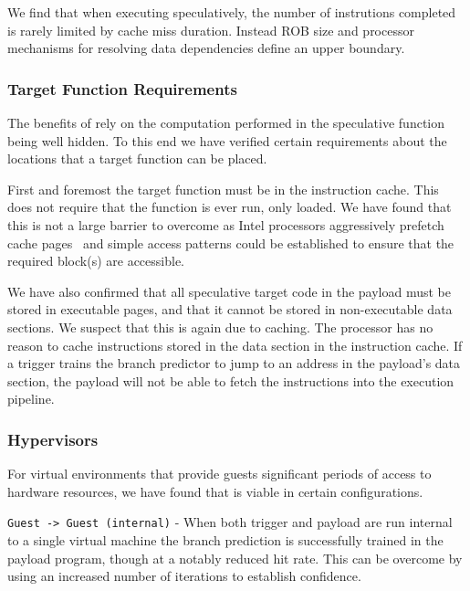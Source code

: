 \medskip

We find that when executing speculatively, the number of instrutions completed
is rarely limited by cache miss duration. Instead
ROB size and processor mechanisms for resolving
data dependencies define an upper boundary.


\subsubsection{Target Function Requirements}
The benefits of \speculake rely on the computation performed in the
speculative function being well hidden. To this end we have verified 
certain requirements about the locations that a target function can 
be placed. 

First and foremost the target function must be in the instruction cache. 
This does not require that the function is ever run, only loaded. We have 
found that this is not a large barrier to overcome as Intel 
processors aggressively prefetch cache pages~\cite{measuring-cache}
and simple access patterns could be established to ensure
that the required block(s) are accessible. 

We have also confirmed that all speculative target code in the payload must be
stored in executable pages, and that it cannot be stored in non-executable data
sections.  We suspect that this is again due to caching. The processor has no
reason to cache instructions stored in the data section in the instruction
cache. If a trigger trains the branch predictor to jump to an address in the
payload's data section, the payload will not be able to fetch the instructions
into the execution pipeline. 


\subsubsection{Hypervisors}
For virtual environments that provide guests significant periods of access to 
hardware resources, we have found that \speculake is viable in certain configurations. 

\texttt{Guest -> Guest (internal)} - When both trigger and payload are run internal to
a single virtual machine the branch prediction is successfully trained in the payload
program, though at a notably reduced hit rate. This can be overcome by using an 
increased number of iterations to establish confidence. 

